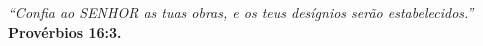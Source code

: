 \documentclass[
	12pt,				%
	openright,			%
	oneside,			%
	a4paper,			%
	chapter=TITLE,		%
	english,			%
	french,				%
	spanish,			%
	brazil				%
	]{abntex2}
\begin{document}
\begin{dedicatoria}
   \vspace*{\fill}
   \centering
   \noindent
   \textit{} \vspace*{\fill}
\end{dedicatoria}



\begin{epigrafe}
    \vspace*{\fill}
	\begin{flushright}
		\textit{“Confia ao SENHOR as tuas obras, e os teus desígnios serão estabelecidos.”\\}
			  \textbf{Provérbios 16:3.}
	\end{flushright}
\end{epigrafe}


\setlength{\absparsep}{18pt} %







\listoffigures*
\cleardoublepage

\listoftables*
\cleardoublepage
\end{document}
